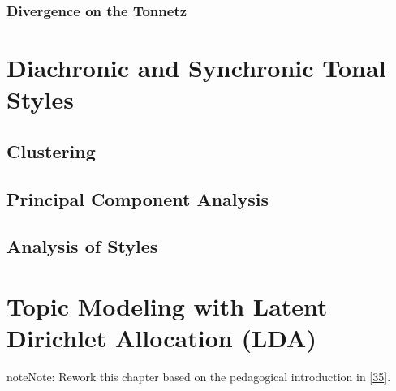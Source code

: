 \documentclass[letterpaper,10pt,english]{sphinxmanual}
\begin{document}
\subsection{Divergence on the Tonnetz}
\label{\detokenize{5_notes:divergence-on-the-tonnetz}}

\chapter{Diachronic and Synchronic Tonal Styles}
\label{\detokenize{5_notes:diachronic-and-synchronic-tonal-styles}}

\section{Clustering}
\label{\detokenize{5_notes:clustering}}

\section{Principal Component Analysis}
\label{\detokenize{5_notes:principal-component-analysis}}

\section{Analysis of Styles}
\label{\detokenize{5_notes:analysis-of-styles}}

\chapter{Topic Modeling with Latent Dirichlet Allocation (LDA)}
\label{\detokenize{5_notes:topic-modeling-with-latent-dirichlet-allocation-lda}}
\begin{sphinxadmonition}{note}{Note:}
\sphinxAtStartPar
Rework this chapter based on the pedagogical introduction
in {[}\hyperlink{cite.8_bibliography:id9}{35}{]}.
\end{sphinxadmonition}

\sphinxAtStartPar
{}
\end{document}
